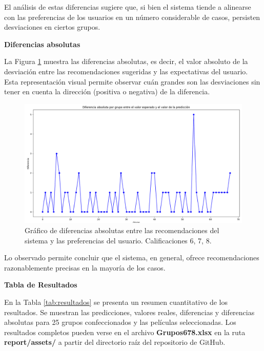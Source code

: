 \documentclass[runningheads,a4paper]{llncs}
\begin{document}
El análisis de estas diferencias sugiere que, si bien el sistema tiende a alinearse con las preferencias de los usuarios en un número considerable de casos, persisten desviaciones en ciertos grupos.

\textbf{Diferencias absolutas}

La Figura \ref{fig:absolutas} muestra las diferencias absolutas, es decir, el valor absoluto de la desviación entre las recomendaciones sugeridas y las expectativas del usuario. Esta representación visual permite observar cuán grandes son las desviaciones sin tener en cuenta la dirección (positiva o negativa) de la diferencia.

\begin{figure}[h]
    \centering
    \includegraphics[width=\columnwidth]{assets/absolutas678.png}
    \caption{Gráfico de diferencias absolutas entre las recomendaciones del sistema y las preferencias del usuario. Calificaciones 6, 7, 8.}
    \label{fig:absolutas}
\end{figure}

Lo observado permite concluir que el sistema, en general, ofrece recomendaciones razonablemente precisas en la mayoría de los casos.

\textbf{Tabla de Resultados}

En la Tabla \ref{tab:resultados} se presenta
un resumen cuantitativo de los resultados. Se muestran 
las predicciones, valores reales, diferencias y 
diferencias absolutas para 25 grupos confeccionados y 
las películas seleccionadas. Los resultados completos 
pueden verse en el archivo \textbf{Grupos678.xlsx} en la ruta \textbf{report/assets/} a partir del directorio raíz del repositorio de GitHub.
\end{document}
